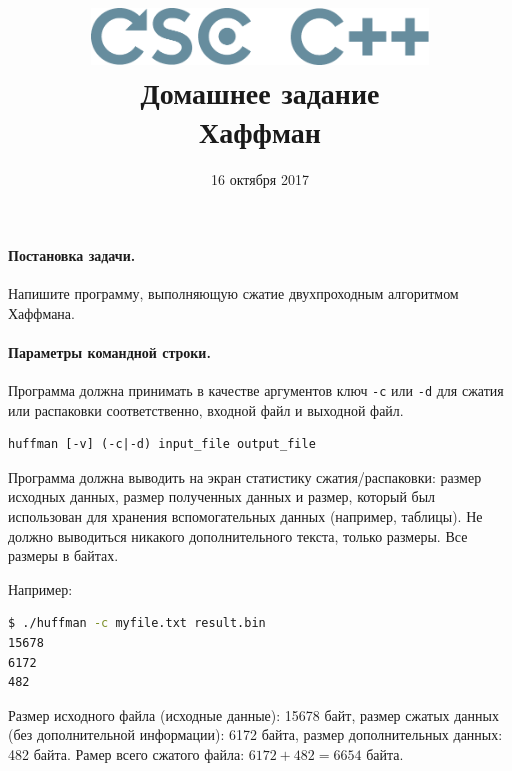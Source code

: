 \documentclass[a4paper,10pt]{article}
\begin{document}

\lstset{
  basicstyle=\ttfamily,
  columns=fullflexible
}

\title{\includegraphics[height=15mm]{../CSCCPP}\\[1em]
Домашнее задание  \\ Хаффман}
\preauthor{}
\author{}
\postauthor{}
\date{16 октября 2017}

\maketitle

\paragraph{Постановка задачи.}

Напишите программу, выполняющую сжатие двухпроходным алгоритмом Хаффмана.

\paragraph{Параметры командной строки.}
Программа должна принимать в качестве аргументов ключ {\tt -c} или {\tt -d} для сжатия или распаковки соответственно, входной файл и выходной файл.
\begin{lstlisting}[frame=single]
huffman [-v] (-c|-d) input_file output_file
\end{lstlisting}

Программа должна выводить на экран статистику сжатия/распаковки:
размер исходных данных, размер полученных данных и размер,
который был использован для хранения вспомогательных данных (например, таблицы).
Не должно выводиться никакого дополнительного текста, только размеры.
Все размеры в байтах.

Например:
\begin{lstlisting}[language=bash, frame=single]
$ ./huffman -c myfile.txt result.bin
15678
6172
482
\end{lstlisting}

Размер исходного файла (исходные данные): 15678 байт, размер сжатых данных
(без дополнительной информации): 6172 байта, размер дополнительных данных:
482 байта. Рамер всего сжатого файла: $6172 + 482 = 6654$ байта.
\end{document}
